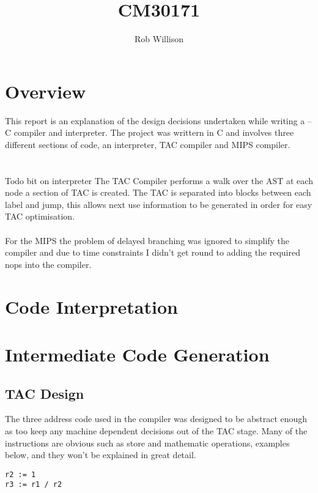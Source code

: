 \documentclass{article}
\begin{document}
\title{CM30171}
\author{Rob Willison}

\maketitle
\tableofcontents

\section{Overview}
This report is an explanation of the design decisions undertaken while writing
a --C compiler and interpreter. The project was writtern in C and involves three
different sections of code, an interpreter, TAC compiler and MIPS compiler.\\~\\
\\Todo bit on interpreter
The TAC Compiler performs a walk over the AST at each node a section of TAC is created.
The TAC is separated into blocks between each label and jump, this allows next use
information to be generated in order for easy TAC optimisation.\\~\\
For the MIPS the problem of delayed branching was ignored to simplify the compiler
and due to time constraints I didn't get round to adding the required nops into the
compiler.


\newpage
\section{Code Interpretation}

\section{Intermediate Code Generation}

\subsection{TAC Design}

The three address code used in the compiler was designed to be abstract enough as
too keep any machine dependent decisions out of the TAC stage. Many of the instructions
are obvious such as store and mathematic operations, examples below, and they won't be explained in
great detail.

\begin{lstlisting}
r2 := 1
r3 := r1 / r2
\end{lstlisting}
\end{document}
